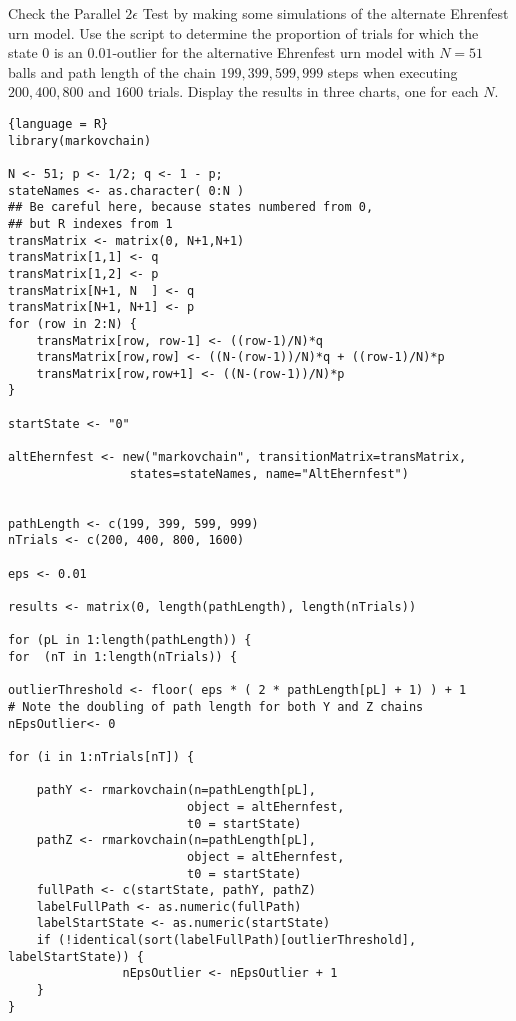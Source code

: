 \documentclass[12pt]{article}
\begin{document}
\begin{exercise}
    Check the Parallel \( 2 \epsilon \) Test by making some simulations
    of the alternate Ehrenfest urn model. Use the script to determine
    the proportion of trials for which the state \( 0 \) is an \( 0.01 \)-outlier
    for the alternative Ehrenfest urn model with \( N = 51 \) balls and
    path length of the chain \( 199, 399, 599, 999 \) steps when
    executing \( 200, 400, 800 \) and \( 1600 \) trials.  Display the
    results in three charts, one for each \( N \).
\end{exercise}
\begin{solution}

\begin{lstlisting}{language = R}
library(markovchain)

N <- 51; p <- 1/2; q <- 1 - p;
stateNames <- as.character( 0:N )
## Be careful here, because states numbered from 0,
## but R indexes from 1
transMatrix <- matrix(0, N+1,N+1)
transMatrix[1,1] <- q
transMatrix[1,2] <- p
transMatrix[N+1, N  ] <- q
transMatrix[N+1, N+1] <- p
for (row in 2:N) {
    transMatrix[row, row-1] <- ((row-1)/N)*q
    transMatrix[row,row] <- ((N-(row-1))/N)*q + ((row-1)/N)*p
    transMatrix[row,row+1] <- ((N-(row-1))/N)*p
}

startState <- "0"

altEhernfest <- new("markovchain", transitionMatrix=transMatrix,
                 states=stateNames, name="AltEhernfest")


pathLength <- c(199, 399, 599, 999)
nTrials <- c(200, 400, 800, 1600)

eps <- 0.01

results <- matrix(0, length(pathLength), length(nTrials))

for (pL in 1:length(pathLength)) {
for  (nT in 1:length(nTrials)) {

outlierThreshold <- floor( eps * ( 2 * pathLength[pL] + 1) ) + 1
# Note the doubling of path length for both Y and Z chains
nEpsOutlier<- 0

for (i in 1:nTrials[nT]) {
            
    pathY <- rmarkovchain(n=pathLength[pL],
                         object = altEhernfest,
                         t0 = startState)
    pathZ <- rmarkovchain(n=pathLength[pL],
                         object = altEhernfest,
                         t0 = startState)
    fullPath <- c(startState, pathY, pathZ)
    labelFullPath <- as.numeric(fullPath)
    labelStartState <- as.numeric(startState)
    if (!identical(sort(labelFullPath)[outlierThreshold], labelStartState)) {
                nEpsOutlier <- nEpsOutlier + 1
    }
}


\end{lstlisting}
\end{solution}
\end{document}
